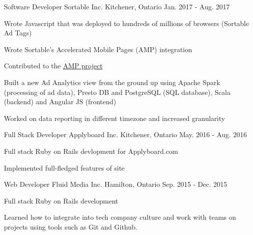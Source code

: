 

\begin{cventries}

  \cventry
    {Software Developer} %
    {Sortable Inc.} %
    {Kitchener, Ontario} %
    {Jan. 2017 - Aug. 2017} %
    {
      \begin{cvitems} %
        \item {Wrote Javascript that was deployed to
            hundreds of millions of browsers (Sortable Ad Tags)}
        \item {Wrote Sortable's Accelerated Mobile Pages (AMP) integration}
        \item {Contributed to the \href{https://github.com/ampproject/amphtml}{AMP project}}
        \item {Built a new Ad Analytics view from the ground up using
            Apache Spark (processing of ad data),
            Presto DB and PostgreSQL (SQL database), Scala (backend) and Angular JS (frontend)}
        \item {Worked on data reporting in different timezone and
            increased granularity}
      \end{cvitems}
    }

  \cventry
    {Full Stack Developer} %
    {Applyboard Inc.} %
    {Kitchener, Ontario} %
    {May. 2016 - Aug. 2016} %
    {
      \begin{cvitems} %
        \item {Full stack Ruby on Rails devlopment for Applyboard.com}
        \item {Implemented full-fledged features of site}
      \end{cvitems}
    }

  \cventry
    {Web Developer} %
    {Fluid Media Inc.}%
    {Hamilton, Ontario} %
    {Sep. 2015 - Dec. 2015} %
    {
      \begin{cvitems} %
        \item {Full stack Ruby on Rails development}
        \item {Learned how to integrate into tech company culture and work with teams on
projects using tools such as Git and Github.}
      \end{cvitems}
    }

\end{cventries}
